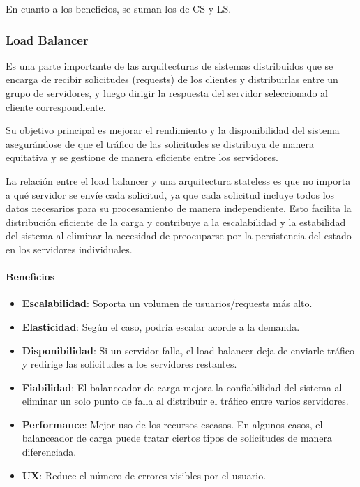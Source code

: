 \documentclass{article}
\begin{document}
		En cuanto a los beneficios, se suman los de CS y LS.
		
		\subsubsection{Load Balancer}\label{sec:load_balancer}
		Es una parte importante de las arquitecturas de sistemas distribuidos que se encarga de recibir solicitudes (requests) de los clientes y distribuirlas entre un grupo de servidores, y luego dirigir la respuesta del servidor seleccionado al cliente correspondiente. 
		
		Su objetivo principal es mejorar el rendimiento y la disponibilidad del sistema asegurándose de que el tráfico de las solicitudes se distribuya de manera equitativa y se gestione de manera eficiente entre los servidores.
		
		La relación entre el load balancer y una arquitectura stateless es que no importa a qué servidor se envíe cada solicitud, ya que cada solicitud incluye todos los datos necesarios para su procesamiento de manera independiente. Esto facilita la distribución eficiente de la carga y contribuye a la escalabilidad y la estabilidad del sistema al eliminar la necesidad de preocuparse por la persistencia del estado en los servidores individuales.
		
		
		
		
		
		
		\paragraph{Beneficios}
		\begin{itemize}	
			\item {\textbf{Escalabilidad}}: Soporta un volumen de usuarios/requests más alto.
			
			\item {\textbf{Elasticidad}}: Según el caso, podría escalar acorde a la demanda.
			
			\item {\textbf{Disponibilidad}}: Si un servidor falla, el load balancer deja de enviarle tráfico y redirige las solicitudes a los servidores restantes.
			
			\item {\textbf{Fiabilidad}}: El balanceador de carga mejora la confiabilidad del sistema al eliminar un solo punto de falla al distribuir el tráfico entre varios servidores.
			
			\item {\textbf{Performance}}: Mejor uso de los recursos escasos. En algunos casos, el balanceador de carga puede tratar ciertos tipos de solicitudes de manera diferenciada. 
			
			\item {\textbf{UX}}: Reduce el número de errores visibles por el usuario.
			
		\end{itemize}
		
\end{document}
